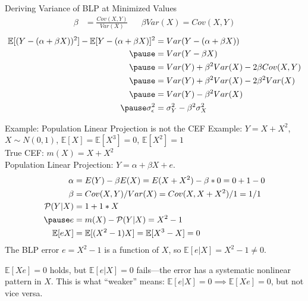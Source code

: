 \documentclass[aspectratio=169]{beamer}
\numberwithin{equation}{section}
\begin{document}
\begin{frame}{Deriving Variance of BLP at Minimized Values}
\begin{align*}
\beta &=\frac{Cov(X,Y)}{Var(X)}&&  \beta Var(X)=Cov(X,Y)
\end{align*}  \pause
\begin{align*}
\mathbb{E}[(Y-(\alpha+\beta X))^2]-\mathbb{E}[Y-(\alpha+\beta X)]^2 &=Var(Y-(\alpha+\beta X))\\\pause
&=Var(Y-\beta X)\\\pause
&=Var(Y)+\beta^2Var(X)-2\beta Cov(X,Y)\\\pause
 &=Var(Y)+\beta^2Var(X)-2\beta^2 Var(X)\\\pause
  &=Var(Y)-\beta^2 Var(X)\\\pause
  \sigma^2_\epsilon  &=\sigma^2_Y-\beta^2 \sigma^2_X\\
\end{align*}
\end{frame}



\begin{frame}{Example: Population Linear Projection is not the CEF}
Example: $Y=X+X^2$, $X\sim N(0,1)$, $\mathbb{E}[X]=\mathbb{E}[X^3]=0$, $\mathbb{E}[X^2]=1$\\
True CEF: $m(X)=X+X^2$\\
 Population Linear Projection: $Y=\alpha+\beta X+e$.
\begin{align*}
\alpha&=E(Y)-\beta E(X)=E(X+X^2)-\beta*0=0+1-0\\
\beta&=Cov(X,Y)/Var(X)=Cov(X,X+X^2)/1=1/1\\
\mathcal{P}(Y|X)&=1+1*X\\\pause
e&=m(X)-\mathcal{P}(Y|X)=X^2-1\\
\mathbb{E}[eX]&=\mathbb{E}[(X^2-1)X]=\mathbb{E}[X^3-X]=0
\end{align*}
\pause
The BLP error $e=X^2-1$ is a function of $X$, so $\mathbb{E}[e|X]=X^2-1\neq 0$.

\smallskip
$\mathbb{E}[Xe]=0$ holds, but $\mathbb{E}[e|X]=0$ fails---the error has a systematic nonlinear pattern in $X$.  This is what ``weaker'' means: $\mathbb{E}[e|X]=0 \implies \mathbb{E}[Xe]=0$, but not vice versa.
\end{frame}
\end{document}
